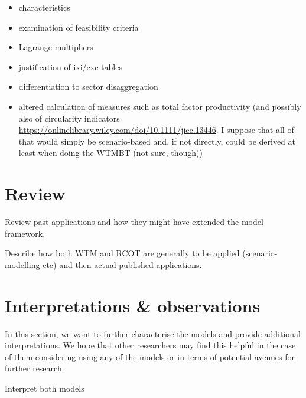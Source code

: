 \documentclass{article}
\begin{document}
\begin{refsection}
\begin{itemize}
    \item characteristics
    \item examination of feasibility criteria
    \item Lagrange multipliers
    \item justification of ixi/cxc tables
    \item differentiation to sector disaggregation
    \item altered calculation of measures such as total factor productivity (and possibly also of circularity indicators \url{https://onlinelibrary.wiley.com/doi/10.1111/jiec.13446}. I suppose that all of that would simply be scenario-based and, if not directly, could be derived at least when doing the WTMBT (not sure, though))
\end{itemize}

\section{Review}

Review past applications and how they might have extended the model framework.

Describe how both WTM and RCOT are generally to be applied (scenario-modelling etc) and then actual published applications.

\section{Interpretations \& observations}

In this section, we want to further characterise the models and provide additional interpretations. We hope that other researchers may find this helpful in the case of them considering using any of the models or in terms of potential avenues for further research.

Interpret both models


\end{refsection}
\end{document}
